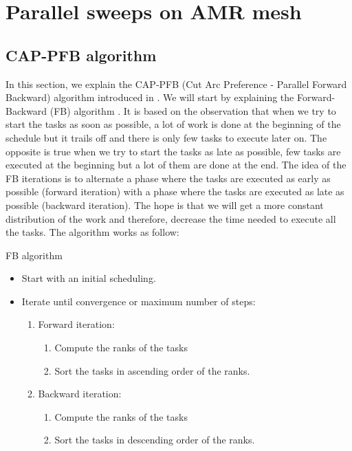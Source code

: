\documentclass[letterpaper]{article}
\renewcommand{\(}{\left(}
\renewcommand{\)}{\right)}
\renewcommand{\[}{\left[}
\renewcommand{\]}{\right]}
\begin{document}
\section{Parallel sweeps on AMR mesh} \label{parallel_sweeps}
\subsection{CAP-PFB algorithm}
In this section, we explain the CAP-PFB (Cut Arc Preference - Parallel Forward
Backward) algorithm introduced in \cite{Mo2014}. We will start by
explaining the Forward-Backward (FB) algorithm \cite{Li1992}. It is based on the 
observation that when we try to start the tasks as soon as possible, a lot of
work is done at the beginning of the schedule but it trails off and there is only few tasks to
execute later on. The opposite is true when we try
to start the tasks as late as possible, few tasks are executed at the beginning but a
lot of them are done at the end. The idea of the FB iterations is 
to alternate a phase where the tasks are executed as early as possible (forward
iteration) with a phase where the tasks are executed as late as possible
(backward iteration). The hope is that we will get a more constant distribution
of the work and therefore, decrease the time needed to execute all the tasks. The algorithm works 
as follow:
\begin{algorithm}[H]
  \caption{FB algorithm}
  \begin{itemize}
    \item Start with an initial scheduling.
    \item Iterate until convergence or maximum number of steps:
      \begin{enumerate}
        \item Forward iteration:
          \begin{enumerate}
            \item Compute the ranks of the tasks
            \item Sort the tasks in ascending order of the ranks.
          \end{enumerate}
        \item Backward iteration:
          \begin{enumerate}
            \item Compute the ranks of the tasks
            \item Sort the tasks in descending order of the ranks.
          \end{enumerate}
      \end{enumerate}
  \end{itemize}
\end{algorithm}
\end{document}
